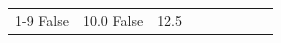 \begin{table}[H]
\begin{tabular}{lllrlllll}
\cline{1-9}
False & 10.0%
\cline{1-9}
False & 12.5%

\end{tabular}
\end{table}
